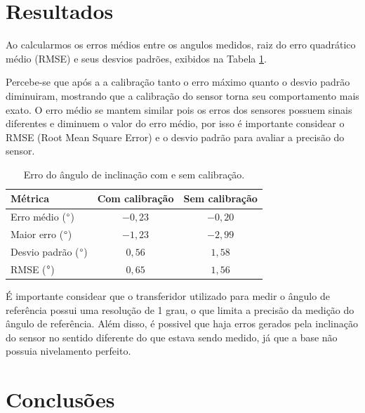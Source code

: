 \documentclass[conference]{IEEEtran}
\begin{document}
\section{Resultados}

Ao calcularmos os erros médios entre os angulos medidos, raiz do erro quadrático médio (RMSE) e seus desvios padrões, exibidos na Tabela \ref{tab:erro_angulo}.

Percebe-se que após a a calibração tanto o erro máximo quanto o desvio padrão diminuiram, mostrando que a calibração do sensor torna seu comportamento mais exato. O erro médio se mantem similar pois os erros dos sensores possuem sinais diferentes e diminuem o valor do erro médio, por isso é importante considear o RMSE (Root Mean Square Error) e o desvio padrão para avaliar a precisão do sensor.

\begin{table}[h]
\centering
\caption{Erro do ângulo de inclinação com e sem calibração.}
\label{tab:erro_angulo}
\begin{tabular}{lcc}
\hline
Métrica & Com calibração & Sem calibração \\
\hline
Erro médio (${\degree}$)          & $-0{,}23$ & $-0{,}20$ \\
Maior erro (${\degree}$)          & $-1{,}23$ & $-2{,}99$ \\
Desvio padrão (${\degree}$)       & $0{,}56$ & $1{,}58$ \\
RMSE (${\degree}$)                & $0{,}65$ & $1{,}56$ \\
\hline
\end{tabular}
\end{table}

É importante considear que o transferidor utilizado para medir o ângulo de referência possui uma resolução de 1 grau, o que limita a precisão da medição do ângulo de referência. Além disso, é possivel que haja erros gerados pela inclinação do sensor no sentido diferente do que estava sendo medido, já que a base não possuia nivelamento perfeito.

\section{Conclusões}
\end{document}
